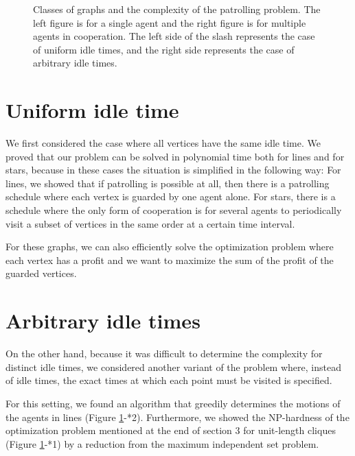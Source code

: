 \begin{figure}[htbp]
\begin{minipage}{0.48\hsize}
  \end{minipage}
  \caption{Classes of graphs and the complexity of the patrolling problem.
  The left figure is for a single agent and the right figure is for multiple agents in cooperation.
  The left side of the slash represents the case of uniform idle times, and the right side represents the case of arbitrary idle times.}
  \label{fig:shapeandcomplexity}
\end{figure}




\section{Uniform idle time}
We first considered the case where all vertices have the same idle time.  We proved that our problem can be solved in polynomial time both for lines and for stars, because in these cases the situation is simplified in the following way: 
For lines, we showed that if patrolling is possible at all, then there is a patrolling schedule where each vertex is guarded by one agent alone. 
For stars, there is a schedule where the only form of cooperation is for several agents to periodically visit a subset of vertices in the same order at a certain time interval.

For these graphs, we can also efficiently solve the optimization problem where each vertex has a profit and we want to maximize the sum of the profit of the guarded vertices. 

\section{Arbitrary idle times}

On the other hand, because it was difficult to determine the complexity for distinct idle times, 
we considered another variant of the problem where,
instead of idle times, 
the exact times at which each point must be visited is specified.

For this setting, we found an algorithm that greedily determines the motions of the agents in lines (Figure \ref{fig:shapeandcomplexity}-*2).
Furthermore, we showed the NP-hardness of
the optimization problem mentioned at the end of section 3 for unit-length cliques (Figure \ref{fig:shapeandcomplexity}-*1)
by a reduction from the maximum independent set problem.
